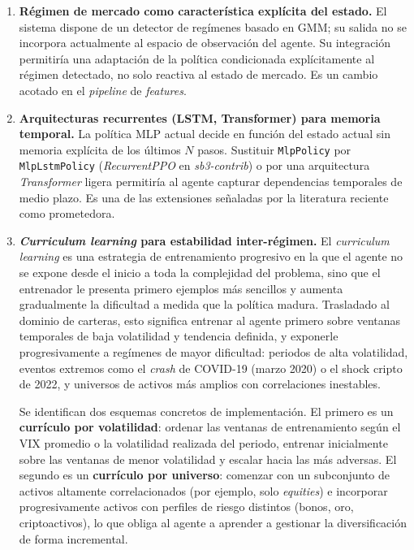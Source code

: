 \documentclass[IB,a4paper]{TFUOC}
\begin{document}
\begin{enumerate}
    \item \textbf{Régimen de mercado como característica explícita del estado.} El sistema dispone de un detector de regímenes basado en GMM; su salida no se incorpora actualmente al espacio de observación del agente. Su integración permitiría una adaptación de la política condicionada explícitamente al régimen detectado, no solo reactiva al estado de mercado. Es un cambio acotado en el \textit{pipeline} de \textit{features}.

    \item \textbf{Arquitecturas recurrentes (LSTM, Transformer) para memoria temporal.} La política MLP actual decide en función del estado actual sin memoria explícita de los últimos $N$ pasos. Sustituir \texttt{MlpPolicy} por \texttt{MlpLstmPolicy} (\textit{RecurrentPPO} en \textit{sb3-contrib}) o por una arquitectura \textit{Transformer} ligera permitiría al agente capturar dependencias temporales de medio plazo. Es una de las extensiones señaladas por la literatura reciente como prometedora.

    \item \textbf{\textit{Curriculum learning} para estabilidad inter-régimen.}
    El \textit{curriculum learning} \citep{bengio2009curriculum} es una estrategia de entrenamiento progresivo en la que el agente no se expone desde el inicio a toda la complejidad del problema, sino que el entrenador le presenta primero ejemplos más sencillos y aumenta gradualmente la dificultad a medida que la política madura. Trasladado al dominio de carteras, esto significa entrenar al agente primero sobre ventanas temporales de baja volatilidad y tendencia definida, y exponerle progresivamente a regímenes de mayor dificultad: periodos de alta volatilidad, eventos extremos como el \textit{crash} de COVID-19 (marzo 2020) o el shock cripto de 2022, y universos de activos más amplios con correlaciones inestables.

    Se identifican dos esquemas concretos de implementación. El primero es un \textbf{currículo por volatilidad}: ordenar las ventanas de entrenamiento según el VIX promedio o la volatilidad realizada del periodo, entrenar inicialmente sobre las ventanas de menor volatilidad y escalar hacia las más adversas. El segundo es un \textbf{currículo por universo}: comenzar con un subconjunto de activos altamente correlacionados (por ejemplo, solo \textit{equities}) e incorporar progresivamente activos con perfiles de riesgo distintos (bonos, oro, criptoactivos), lo que obliga al agente a aprender a gestionar la diversificación de forma incremental.


\end{enumerate}
\end{document}
